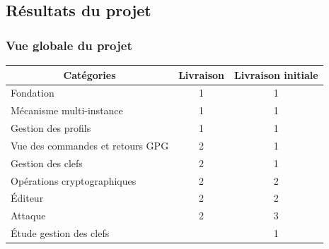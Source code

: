  \subsection{Résultats du projet}
  \begin{frame}
    \frametitle{\color{white}Vue globale du projet}
  \begin{tabular}{|l|l|l|}
    \hline
    \multicolumn{1}{|c|}{\cellcolor{gray} \color{white}Catégories} & \multicolumn{1}{|c|}{\cellcolor{gray} \color{white}Livraison} & \multicolumn{1}{|c|}{\cellcolor{gray} \color{white}Livraison initiale} \\
    \hline
    \cellcolor{white}\color{green}Fondation & \multicolumn{1}{|c|}{\cellcolor{white}\color{black}1} & \multicolumn{1}{|c|}{\cellcolor{white}\color{black}1} \\
    \hline
    \cellcolor{white}\color{green}Mécanisme multi-instance & \multicolumn{1}{|c|}{\cellcolor{white}\color{black}1} & \multicolumn{1}{|c|}{\cellcolor{white}\color{black}1} \\    
    \hline
    \cellcolor{white}\color{green}Gestion des profils & \multicolumn{1}{|c|}{\cellcolor{white}\color{black}1} & \multicolumn{1}{|c|}{\cellcolor{white}\color{black}1} \\
    \hline
    \cellcolor{white}\color{green}Vue des commandes et retours GPG & \multicolumn{1}{|c|}{\cellcolor{white}\color{black}2} & \multicolumn{1}{|c|}{\cellcolor{white}\color{black}1} \\
    \hline
    \cellcolor{white}\color{blue}Gestion des clefs & \multicolumn{1}{|c|}{\cellcolor{white}\color{black}2} & \multicolumn{1}{|c|}{\cellcolor{white}\color{black}1} \\
    \hline
    \cellcolor{white}\color{blue}Opérations cryptographiques & \multicolumn{1}{|c|}{\cellcolor{white}\color{black}2} & \multicolumn{1}{|c|}{\cellcolor{white}\color{black}2} \\
    \hline
    \cellcolor{white}\color{blue}\'{E}diteur & \multicolumn{1}{|c|}{\cellcolor{white}\color{black}2} & \multicolumn{1}{|c|}{\cellcolor{white}\color{black}2} \\
    \hline
    \cellcolor{white}\color{red}Attaque & \multicolumn{1}{|c|}{\cellcolor{white}\color{black}2} & \multicolumn{1}{|c|}{\cellcolor{white}\color{black}3} \\
    \hline
    \cellcolor{white}\color{red}\'{E}tude gestion des clefs & \multicolumn{1}{|c|}{\cellcolor{white}\color{black}} & \multicolumn{1}{|c|}{\cellcolor{white}\color{black}1} \\

\end{tabular}
\end{frame}
